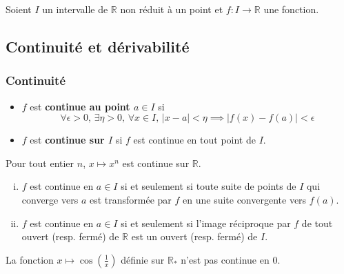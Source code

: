 




	Soient $I$ un intervalle de $\mathbb{R}$ non réduit à un point et $f : I \rightarrow \mathbb{R}$ une fonction.

	\subsection{Continuité et dérivabilité}

	\subsubsection{Continuité}


	\begin{definition}
		\begin{itemize}
			\item $f$ est \textbf{continue au point $a \in I$} si
			\[ \forall \epsilon > 0, \, \exists \eta > 0, \, \forall x \in I, \, \vert x - a \vert < \eta \implies \vert f(x) - f(a) \vert < \epsilon \]
			\item $f$ est \textbf{continue sur $I$} si $f$ est continue en tout point de $I$.
		\end{itemize}
	\end{definition}

	\begin{example}
		Pour tout entier $n$, $x \mapsto x^n$ est continue sur $\mathbb{R}$.
	\end{example}

	\begin{theorem}
		\begin{enumerate}[(i)]
			\item $f$ est continue en $a \in I$ si et seulement si toute suite de points de $I$ qui converge vers $a$ est transformée par $f$ en une suite convergente vers $f(a)$.
			\item $f$ est continue en $a \in I$ si et seulement si l'image réciproque par $f$ de tout ouvert (resp. fermé) de $\mathbb{R}$ est un ouvert (resp. fermé) de $I$.
		\end{enumerate}
	\end{theorem}

	\begin{example}
		La fonction $x \mapsto \cos \left( \frac{1}{x} \right)$ définie sur $\mathbb{R}_*$ n'est pas continue en $0$.
	\end{example}

